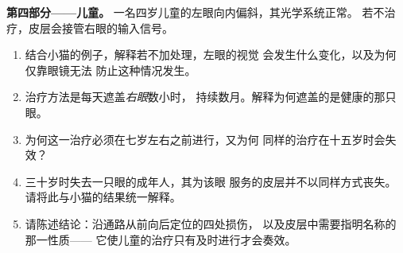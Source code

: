 \begin{problem}
\medskip
\noindent\textbf{第四部分——儿童。}
一名四岁儿童的左眼向内偏斜，其光学系统正常。
若不治疗，皮层会接管右眼的输入信号。
\begin{enumerate}[resume]
  \item 结合小猫的例子，解释若不加处理，左眼的视觉
        会发生什么变化，以及为何仅靠眼镜无法
        防止这种情况发生。
  \item 治疗方法是每天遮盖\emph{右眼}数小时，
        持续数月。解释为何遮盖的是健康的那只眼。
  \item 为何这一治疗必须在七岁左右之前进行，又为何
        同样的治疗在十五岁时会失效？
  \item 三十岁时失去一只眼的成年人，其为该眼
        服务的皮层并不以同样方式丧失。请将此与小猫的结果统一解释。
  \item 请陈述结论：沿通路从前向后定位的四处损伤，
        以及皮层中需要指明名称的那一性质——
        它使儿童的治疗只有及时进行才会奏效。
\end{enumerate}
\end{problem}
